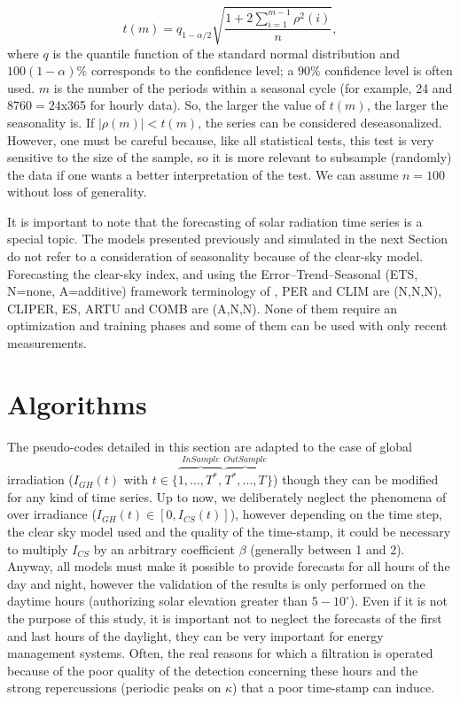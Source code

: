 \documentclass[preprint,12pt,3p]{elsarticle}
\begin{document}
\begin{equation}
\label{eq:24}
    t(m)=q_{1-\alpha/2}\sqrt{\frac{1+2\sum_{i=1}^{m-1}\rho^2(i)}{n}},
\end{equation}
where $q$ is the quantile function of the standard normal distribution and $100(1 - \alpha)\%$ corresponds to the confidence level; a $90\%$ confidence level is often used. $m$ is the number of the periods within a seasonal cycle (for example,  24 and $8760=24$x365 for hourly data).
So, the larger the value of $t(m)$, the larger the seasonality is. If $\lvert \rho(m)\lvert<t(m)$, the series can be considered deseasonalized. However, one must be careful because, like all statistical tests, this test is very sensitive to the size of the sample, so it is more relevant to subsample (randomly) the data if one wants a better interpretation of the test. We can assume $n=100$ without loss of generality. 

It is important to note that the forecasting of solar radiation time series is a special topic. The models presented previously and simulated in the next Section do not refer to a consideration of seasonality because of the clear-sky model. Forecasting the clear-sky index, and using the Error--Trend--Seasonal (ETS, N=none, A=additive) framework terminology of \citet{Hynd2008}, PER and CLIM are (N,N,N), CLIPER, ES, ARTU and COMB are (A,N,N). None of them require an optimization and training phases and some of them can be used with only recent measurements.
 
 
 \section{Algorithms}
 \label{appendix}
 The pseudo-codes detailed in this section are adapted to the case of global irradiation ($I_{GH}(t)$ with $t\in \{\overbrace{1,...,T^*,}^{InSample}\overbrace{T^*,...,T}^{OutSample}\}$) though they can be modified for any kind of time series. Up to now, we deliberately neglect the phenomena of over irradiance ($I_{GH}(t) \in [0,I_{CS}(t)]$), however depending on the time step, the clear sky model used and the quality of the time-stamp, it could be necessary to multiply $ I_{CS} $ by an arbitrary coefficient $\beta$ (generally between 1 and 2). Anyway, all models must make it possible to provide forecasts for all hours of the day and night, however the validation of the results is only performed on the daytime hours (authorizing solar elevation greater than $5-10^\circ$). Even if it is not the purpose of this study, it is important not to neglect the forecasts of the first and last hours of the daylight, they can be very important for energy management systems. Often, the real reasons for which a filtration is operated because of the poor quality of the detection concerning these hours and the strong repercussions (periodic peaks on $\kappa$) that a poor time-stamp can induce.
\end{document}
